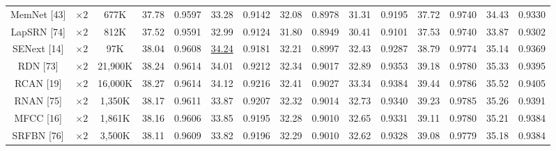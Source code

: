 \documentclass{ieeeaccess}
\begin{document}
\begin{table}
\begin{tabular}{|c|c|c|cc|cc|cc|cc|cc|cc|}
MemNet [43] & $\times 2$&677K& \multicolumn{1}{c|}{37.78} & 0.9597  & \multicolumn{1}{c|}{33.28} &0.9142  &\multicolumn{1}{c|}{32.08} & 0.8978 & \multicolumn{1}{c|}{31.31} &0.9195  & \multicolumn{1}{c|}{37.72} &0.9740
&\multicolumn{1}{c|}{34.43} &0.9330\\

LapSRN [74] & $\times 2$&812K& \multicolumn{1}{c|}{37.52} & 0.9591 & \multicolumn{1}{c|}{32.99} & 0.9124 &\multicolumn{1}{c|}{31.80} & 0.8949 & \multicolumn{1}{c|}{30.41} &  0.9101 & \multicolumn{1}{c|}{37.53} &  0.9740
&\multicolumn{1}{c|}{33.87} & 0.9302\\

SENext [14] & $\times 2$ &97K& \multicolumn{1}{c|}{38.04} & {0.9608} & \multicolumn{1}{c|}{\color{blue}\underline{34.24}} &{ 0.9181} & \multicolumn{1}{c|}{32.21} & {0.8997}& \multicolumn{1}{c|}{32.43} &{0.9287}& \multicolumn{1}{c|}{38.79} &{0.9774} &\multicolumn{1}{c|}{35.14} & {0.9369}\\


RDN [73]& $\times 2$& 21,900K & \multicolumn{1}{c|}{38.24} &0.9614 & \multicolumn{1}{c|}{34.01} & 0.9212 &\multicolumn{1}{c|}{32.34} &0.9017& \multicolumn{1}{c|}{32.89} &0.9353& \multicolumn{1}{c|}{39.18} &0.9780
&\multicolumn{1}{c|}{35.33} & 0.9395\\

RCAN [19]& $\times 2$&16,000K& \multicolumn{1}{c|}{38.27} & 0.9614 & \multicolumn{1}{c|}{34.12} & 0.9216 &\multicolumn{1}{c|}{32.41} & 0.9027& \multicolumn{1}{c|}{33.34} & 0.9384 & \multicolumn{1}{c|}{39.44} & 0.9786
&\multicolumn{1}{c|}{35.52} & 0.9405\\

RNAN [75]& $\times 2$&1,350K& \multicolumn{1}{c|}{38.17} & 0.9611 & \multicolumn{1}{c|}{33.87} &0.9207 &\multicolumn{1}{c|}{32.32} & 0.9014& \multicolumn{1}{c|}{32.73} &0.9340 & \multicolumn{1}{c|}{39.23} & 0.9785
&\multicolumn{1}{c|}{35.26} & 0.9391\\

MFCC [16]& $\times 2$&1,861K& \multicolumn{1}{c|}{38.16} & 0.9606 & \multicolumn{1}{c|}{33.85} &0.9195 &\multicolumn{1}{c|}{32.28} & 0.9010& \multicolumn{1}{c|}{32.65} &0.9331 & \multicolumn{1}{c|}{39.11} & 0.9780
&\multicolumn{1}{c|}{35.21} & 0.9384\\

SRFBN [76]& $\times 2$&3,500K& \multicolumn{1}{c|}{38.11} &  0.9609  & \multicolumn{1}{c|}{33.82 } & 0.9196  &\multicolumn{1}{c|}{32.29} & 0.9010 & \multicolumn{1}{c|}{32.62} & 0.9328 & \multicolumn{1}{c|}{39.08} & 0.9779
&\multicolumn{1}{c|}{35.18} &0.9384\\


\end{tabular}
\end{table}
\end{document}
